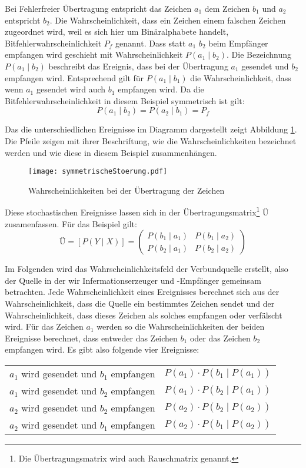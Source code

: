 Bei Fehlerfreier Übertragung entspricht das Zeichen $a_1$ dem Zeichen $b_1$ und $a_2$ entspricht $b_2$. Die Wahrscheinlichkeit, dass ein Zeichen einem falschen Zeichen zugeordnet wird, weil es sich hier um Binäralphabete handelt, Bitfehlerwahrscheinlichkeit $P_f$ genannt. Dass statt $a_1$ $b_2$ beim Empfänger empfangen wird geschieht mit Wahrscheinlichkeit $P(a_1 \mid b_2)$. Die Bezeichnung $P(a_1 \mid b_2)$ beschreibt das Ereignis, dass bei der Übertragung $a_1$ gesendet und $b_2$ empfangen wird. Entsprechend gilt für $P(a_1 \mid b_1)$ die Wahrscheinlichkeit, dass wenn $a_1$ gesendet wird auch $b_1$ empfangen wird. Da die Bitfehlerwahrscheinlichkeit in diesem Beispiel symmetrisch ist gilt:
$$ P(a_1 \mid b_2) = P(a_2 \mid b_1) = P_f $$

Das die unterschiedlichen Ereignisse im Diagramm dargestellt zeigt Abbildung \ref{symStoerung}. Die Pfeile zeigen mit ihrer Beschriftung, wie die Wahrscheinlichkeiten bezeichnet werden und wie diese in diesem Beispiel zusammenhängen. 
\begin{figure}[htbp] %
	\centering
	\texttt{[image: symmetrischeStoerung.pdf]}
	\caption{Wahrscheinlichkeiten bei der Übertragung der Zeichen}
	\label{symStoerung}
\end{figure}
Diese stochastischen Ereignisse lassen sich in der Übertragungsmatrix\footnote{Die Übertragungsmatrix wird auch Rauschmatrix genannt.} $Ü$ zusamenfassen. Für das Beispiel gilt:
$$ 
	Ü = [ P(Y \mid X) ] =
	\left(
	\begin{array}{cc}
		P(b_1 \mid a_1)    & P(b_1 \mid a_2) \\
		P(b_2 \mid a_1) & P(b_2 \mid a_2)
	\end{array}
	\right)
$$

Im Folgenden wird das Wahrscheinlichkeitsfeld der Verbundquelle erstellt, also der Quelle in der wir Infermationserzeuger und -Empfänger gemeinsam betrachten. Jede Wahrscheinlichkeit eines Ereignisses berechnet sich aus der Wahrscheinlichkeit, dass die Quelle ein bestimmtes Zeichen sendet und der Wahrscheinlichkeit, dass dieses Zeichen als solches empfangen oder verfälscht wird. Für das Zeichen $a_1$ werden so die Wahrscheinlichkeiten der beiden Ereignisse berechnet, dass entweder das Zeichen $b_1$ oder das Zeichen $b_2$ empfangen wird. Es gibt also folgende vier Ereignisse:
\begin{center}
	\begin{tabular}{cc}
		$a_1$ wird gesendet und $b_1$ empfangen & $P(a_1) \cdot P(b_1 \mid P(a_1))$ \\
		$a_1$ wird gesendet und $b_2$ empfangen & $P(a_1) \cdot P(b_2 \mid P(a_1))$ \\
		$a_2$ wird gesendet und $b_2$ empfangen & $P(a_2) \cdot P(b_2 \mid P(a_2))$ \\
		$a_2$ wird gesendet und $b_1$ empfangen & $P(a_2) \cdot P(b_1 \mid P(a_2))$ \\ 
	\end{tabular}
\end{center}

